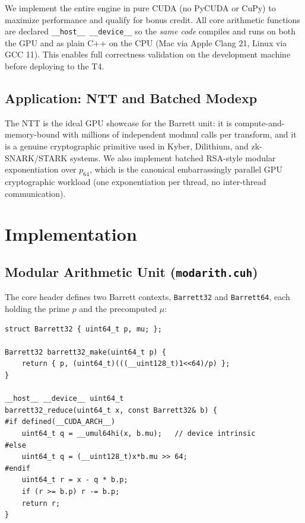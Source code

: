 \documentclass[conference]{IEEEtran}
\begin{document}
We implement the entire engine in pure CUDA (no PyCUDA or CuPy) to maximize performance and
qualify for bonus credit. All core arithmetic functions are declared \texttt{\_\_host\_\_
\_\_device\_\_} so the \emph{same code} compiles and runs on both the GPU and as plain C++ on the
CPU (Mac via Apple Clang 21, Linux via GCC 11). This enables full correctness validation on the
development machine before deploying to the T4.

\subsection{Application: NTT and Batched Modexp}

The NTT is the ideal GPU showcase for the Barrett unit: it is compute-and-memory-bound with
millions of independent modmul calls per transform, and it is a genuine cryptographic primitive used
in Kyber, Dilithium, and zk-SNARK/STARK systems. We also implement batched RSA-style modular
exponentiation over $p_{64}$, which is the canonical embarrassingly parallel GPU cryptographic
workload (one exponentiation per thread, no inter-thread communication).

\section{Implementation}
\label{sec:impl}

\subsection{Modular Arithmetic Unit (\texttt{modarith.cuh})}

The core header defines two Barrett contexts, \texttt{Barrett32} and \texttt{Barrett64}, each
holding the prime $p$ and the precomputed $\mu$:

\begin{lstlisting}
struct Barrett32 { uint64_t p, mu; };

Barrett32 barrett32_make(uint64_t p) {
    return { p, (uint64_t)(((__uint128_t)1<<64)/p) };
}

__host__ __device__ uint64_t
barrett32_reduce(uint64_t x, const Barrett32& b) {
#if defined(__CUDA_ARCH__)
    uint64_t q = __umul64hi(x, b.mu);   // device intrinsic
#else
    uint64_t q = (__uint128_t)x*b.mu >> 64;
#endif
    uint64_t r = x - q * b.p;
    if (r >= b.p) r -= b.p;
    return r;
}
\end{lstlisting}
\end{document}
